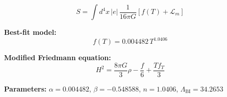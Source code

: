 
\begin{equation}
  S = \int d^4x \, |e| \, \frac{1}{16\pi G} \left[ f(T) + \mathcal{L}_m \right]
\end{equation}

\textbf{Best-fit model:}
\begin{equation}
  f(T) = 0.004482 \, T^{1.0406}
\end{equation}

\textbf{Modified Friedmann equation:}
\begin{equation}
  H^2 = \frac{8\pi G}{3} \rho - \frac{f}{6} + \frac{T f_T}{3}
\end{equation}

\textbf{Parameters:}
$\alpha = 0.004482$, \quad
$\beta = -0.548588$, \quad
$n = 1.0406$, \quad
$\Lambda_{\text{BI}} = 34.2653$